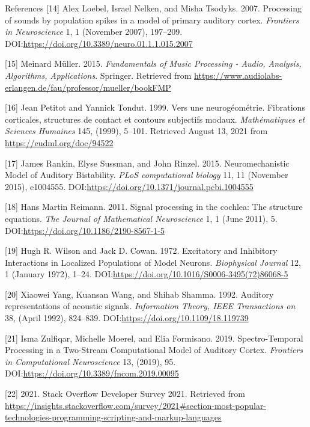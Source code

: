 \documentclass[10pt,american,ignorenonframetext,aspectratio=1610]{beamer}
\theoremstyle{remark}
\begin{document}
\begin{frame}[allowframebreaks]{References}
\leavevmode\hypertarget{ref-loebel2007}{}%
{[}14{]} Alex Loebel, Israel Nelken, and Misha Tsodyks. 2007. Processing
of sounds by population spikes in a model of primary auditory cortex.
\emph{Frontiers in Neuroscience} 1, 1 (November 2007), 197--209.
DOI:\url{https://doi.org/10.3389/neuro.01.1.1.015.2007}

\leavevmode\hypertarget{ref-muller2015}{}%
{[}15{]} Meinard Müller. 2015. \emph{Fundamentals of Music Processing -
Audio, Analysis, Algorithms, Applications}. Springer. Retrieved from
\url{https://www.audiolabs-erlangen.de/fau/professor/mueller/bookFMP}

\leavevmode\hypertarget{ref-petitot1999}{}%
{[}16{]} Jean Petitot and Yannick Tondut. 1999. Vers une neurogéométrie.
Fibrations corticales, structures de contact et contours subjectifs
modaux. \emph{Mathématiques et Sciences Humaines} 145, (1999), 5--101.
Retrieved August 13, 2021 from \url{https://eudml.org/doc/94522}

\leavevmode\hypertarget{ref-rankin2015}{}%
{[}17{]} James Rankin, Elyse Sussman, and John Rinzel. 2015.
Neuromechanistic Model of Auditory Bistability. \emph{PLoS computational
biology} 11, 11 (November 2015), e1004555.
DOI:\url{https://doi.org/10.1371/journal.pcbi.1004555}

\leavevmode\hypertarget{ref-reimann2011}{}%
{[}18{]} Hans Martin Reimann. 2011. Signal processing in the cochlea:
The structure equations. \emph{The Journal of Mathematical Neuroscience}
1, 1 (June 2011), 5. DOI:\url{https://doi.org/10.1186/2190-8567-1-5}

\leavevmode\hypertarget{ref-wilson1972}{}%
{[}19{]} Hugh R. Wilson and Jack D. Cowan. 1972. Excitatory and
Inhibitory Interactions in Localized Populations of Model Neurons.
\emph{Biophysical Journal} 12, 1 (January 1972), 1--24.
DOI:\url{https://doi.org/10.1016/S0006-3495(72)86068-5}

\leavevmode\hypertarget{ref-yang1992}{}%
{[}20{]} Xiaowei Yang, Kuansan Wang, and Shihab Shamma. 1992. Auditory
representations of acoustic signals. \emph{Information Theory, IEEE
Transactions on} 38, (April 1992), 824--839.
DOI:\url{https://doi.org/10.1109/18.119739}

\leavevmode\hypertarget{ref-zulfiqar2019}{}%
{[}21{]} Isma Zulfiqar, Michelle Moerel, and Elia Formisano. 2019.
Spectro-Temporal Processing in a Two-Stream Computational Model of
Auditory Cortex. \emph{Frontiers in Computational Neuroscience} 13,
(2019), 95. DOI:\url{https://doi.org/10.3389/fncom.2019.00095}

\leavevmode\hypertarget{ref-so_survey2021}{}%
{[}22{]} 2021. Stack Overflow Developer Survey 2021. Retrieved from
\url{https://insights.stackoverflow.com/survey/2021\#section-most-popular-technologies-programming-scripting-and-markup-languages}

\end{frame}
\end{document}
